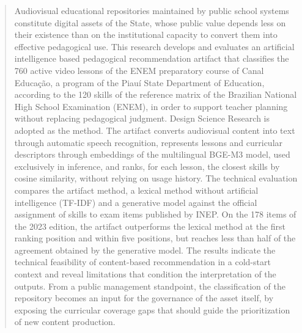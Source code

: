
\begin{abstract}
Audiovisual educational repositories maintained by public school systems
constitute digital assets of the State, whose public value depends less on their
existence than on the institutional capacity to convert them into effective
pedagogical use. This research develops and evaluates an artificial
intelligence based pedagogical recommendation artifact that classifies the 760
active video lessons of the ENEM preparatory course of Canal Educação, a program
of the Piauí State Department of Education, according to the 120 skills of the
reference matrix of the Brazilian National High School Examination (ENEM), in
order to support teacher planning without replacing pedagogical judgment.
Design Science Research is adopted as the method. The artifact converts
audiovisual content into text through automatic speech recognition, represents
lessons and curricular descriptors through embeddings of the multilingual
BGE-M3 model, used exclusively in inference, and ranks, for each lesson, the
closest skills by cosine similarity, without relying on usage history. The
technical evaluation compares the artifact method, a lexical method without
artificial intelligence (TF-IDF) and a generative model against the official
assignment of skills to exam items published by INEP. On the 178 items of the
2023 edition, the artifact outperforms the lexical method at the first ranking
position and within five positions, but reaches less than half of the agreement
obtained by the generative model. The results indicate the technical
feasibility of content-based recommendation in a cold-start context and reveal
limitations that condition the interpretation of the outputs. From a public
management standpoint, the classification of the repository becomes an input
for the governance of the asset itself, by exposing the curricular coverage
gaps that should guide the prioritization of new content production.
\end{abstract}
